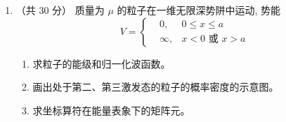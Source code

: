 
\begin{enumerate}
	\item
	（共 30 分）
	质量为 $\mu$ 的粒子在一维无限深势阱中运动, 势能
	$$
	V=\left\{\begin{aligned}
		&0, & 0 \leq x \leq a \\
		&\infty, & x<0 \text { 或 } x>a
	\end{aligned}\right.
	$$
	\begin{enumerate}
		\item
		求粒子的能级和归一化波函数。
		\item
		画出处于第二、第三激发态的粒子的概率密度的示意图。
		\item
		求坐标算符在能量表象下的矩阵元。
		
		
		

\end{enumerate}
\end{enumerate}
